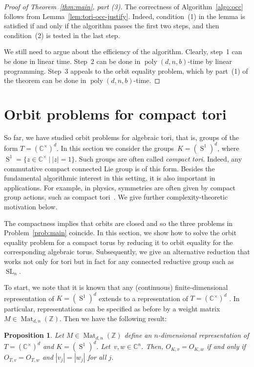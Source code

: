 \documentclass[10pt,a4paper]{article}
\DeclareMathOperator{\SL}{SL}
\DeclareMathOperator{\poly}{poly}
\DeclareMathOperator{\Ss}{S}
\DeclareMathOperator{\Mat}{Mat}
\newtheorem{proposition}[theorem]{Proposition}
\theoremstyle{definition}
\numberwithin{equation}{section}
\newcommand{\CC}{\mathbb{C}}
\newcommand{\ZZ}{\mathbb{Z}}
\begin{document}
\begin{proof} [Proof of Theorem~\ref{thm:main}, part (3)]
The correctness of Algorithm~\ref{algo:occ}  follows from Lemma~\ref{lem:tori-occ-justify}.
Indeed, condition~(1) in the lemma is satisfied if and only if the algorithm passes the first two steps, and then condition~(2) is tested in the last step.

We still need to argue about the efficiency of the algorithm.
Clearly, step~1 can be done in linear time. 
Step~2 can be done in $\poly(d,n,b)$-time by linear programming.
Step~3 appeals to the orbit equality problem, which by part~(1) of the theorem can be done in $\poly(d,n,b)$-time.
\end{proof}


%
\section{Orbit problems for compact tori}\label{sec:compact}
%
So far, we have studied orbit problems for algebraic tori, that is, groups of the form $T = (\CC^\times)^d$.
In this section we consider the groups~$K = (\Ss^1)^d$, where $\Ss^1 = \{z \in \CC^\times \ | \ |z| = 1\}$.
Such groups are often called \emph{compact tori}.
Indeed, any commutative compact connected Lie group is of this form.
Besides the fundamental algorithmic interest in this setting, it is also important in applications.
For example, in physics, symmetries are often given by compact group actions, such as compact tori~\cite{guillemin1990symplectic,audin2012torus}.
We give further complexity-theoretic motivation below.

The compactness implies that orbits are closed and so the three problems in Problem~\ref{prob:main} coincide.
In this section, we show how to solve the orbit equality problem for a compact torus by reducing it to orbit equality for the corresponding algebraic torus.
Subsequently, we give an alternative reduction that works not only for tori but in fact for any connected reductive group such as~$\SL_n$.

To start, we note that it is known that any (continuous) finite-dimensional representation of $K = (\Ss^1)^d$
extends to a representation of $T = (\CC^\times)^d$ \cite{weyl:39}.
%
In particular, representations can be specified as before by a weight matrix $M \in\Mat_{d,n}(\ZZ)$.
Then we have the following result:

\begin{proposition}
Let $M \in\Mat_{d,n}(\ZZ)$ define an $n$-dimensional representation of $T = (\CC^\times)^d$ and $K = (\Ss^1)^d$. Let~$v,w \in \CC^n$.
Then, $O_{K,v} = O_{K,w}$ if and only if $O_{T,v} = O_{T,w}$ and $|v_j| = |w_j|$ for all $j$.
\end{proposition}
\end{document}
